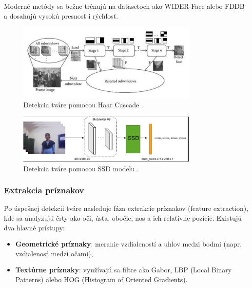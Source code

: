 Moderné metódy sa bežne trénujú na datasetoch ako WIDER-Face alebo FDDB a dosahujú vysokú presnosť i rýchlosť.

\begin{figure}[!htpb]
    \centering
    \includegraphics[width=0.8\textwidth]{img/haar_cascade.png}
    \caption{Detekcia tváre pomocou Haar Cascade \cite{haar_cascade_model}.} 
    \label{fig:haar_cascade}
\end{figure}

\begin{figure}[!htpb]
    \centering
    \includegraphics[width=0.8\textwidth]{img/ssd_model.png}
    \caption{Detekcia tváre pomocou SSD modelu \cite{SSD_model}.} 
    \label{fig:ssd_model}
\end{figure}
\vspace{4.5cm}
\subsubsection{Extrakcia príznakov}
Po úspešnej detekcii tváre nasleduje fáza extrakcie príznakov (feature extraction), kde sa analyzujú črty ako oči, ústa, obočie, nos a ich relatívne pozície. Existujú dva hlavné prístupy:

\begin{itemize}
    \item \textbf{Geometrické príznaky}: meranie vzdialeností a uhlov medzi bodmi (napr. vzdialenosť medzi očami),
    \item \textbf{Textúrne príznaky}: využívajú sa filtre ako Gabor, LBP (Local Binary Patterns) alebo HOG (Histogram of Oriented Gradients).
\end{itemize}

